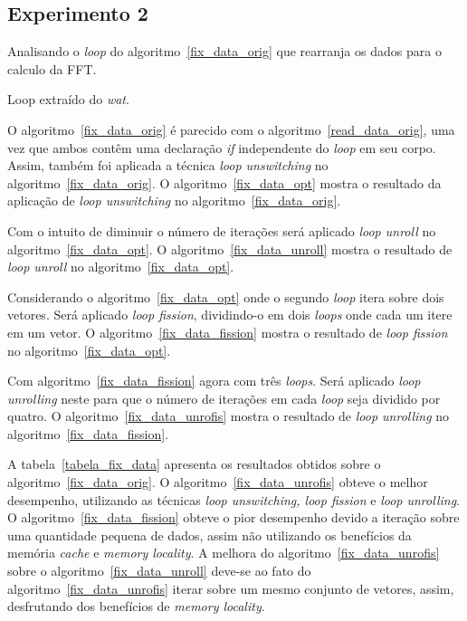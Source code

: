 \subsection{Experimento 2}

Analisando o \textit{loop} do algoritmo~\ref{fix_data_orig} que rearranja os dados
para o calculo da FFT. 

\begin{algorithm}[H]
  \caption{Loop extraído do \textit{wat}.}
    \label{fix_data_orig}

\end{algorithm}

O algoritmo~\ref{fix_data_orig} é parecido com o algoritmo~\ref{read_data_orig}, uma
vez que ambos contêm uma declaração \textit{if} independente do \textit{loop} em seu corpo. 
Assim, também foi aplicada a técnica \textit{loop unswitching} no
algoritmo~\ref{fix_data_orig}.
O algoritmo~\ref{fix_data_opt} mostra o resultado da aplicação de \textit{loop
unswitching} no algoritmo~\ref{fix_data_orig}.

Com o intuito de diminuir o número de iterações será aplicado \textit{loop
unroll} no algoritmo~\ref{fix_data_opt}. 
O algoritmo~\ref{fix_data_unroll} mostra o resultado de \textit{loop unroll} no
algoritmo~\ref{fix_data_opt}.

Considerando o algoritmo~\ref{fix_data_opt} onde o segundo \textit{loop} itera
sobre dois vetores. Será aplicado \textit{loop fission}, dividindo-o em dois 
\textit{loops} onde cada um itere em um vetor.
O algoritmo~\ref{fix_data_fission} mostra o resultado de \textit{loop fission}
no algoritmo~\ref{fix_data_opt}.

Com algoritmo~\ref{fix_data_fission} agora com três \textit{loops}. Será
aplicado \textit{loop unrolling} neste para que o número de iterações em cada
\textit{loop} seja dividido por quatro. 
O algoritmo~\ref{fix_data_unrofis} mostra o resultado de \textit{loop unrolling}
no algoritmo~\ref{fix_data_fission}.

A tabela~\ref{tabela_fix_data} apresenta os resultados obtidos sobre o
algoritmo~\ref{fix_data_orig}.
O algoritmo~\ref{fix_data_unrofis} obteve o melhor desempenho, utilizando as
técnicas \textit{loop unswitching, loop fission} e \textit{loop unrolling}.
O algoritmo~\ref{fix_data_fission} obteve o pior desempenho devido a iteração
sobre uma quantidade pequena de dados, assim não utilizando os benefícios da 
memória \textit{cache} e \textit{memory locality}.
A melhora do algoritmo~\ref{fix_data_unrofis} sobre o
algoritmo~\ref{fix_data_unroll} deve-se ao fato do
algoritmo~\ref{fix_data_unrofis} iterar sobre um mesmo conjunto de vetores,
assim, desfrutando dos benefícios de \textit{memory locality}.

